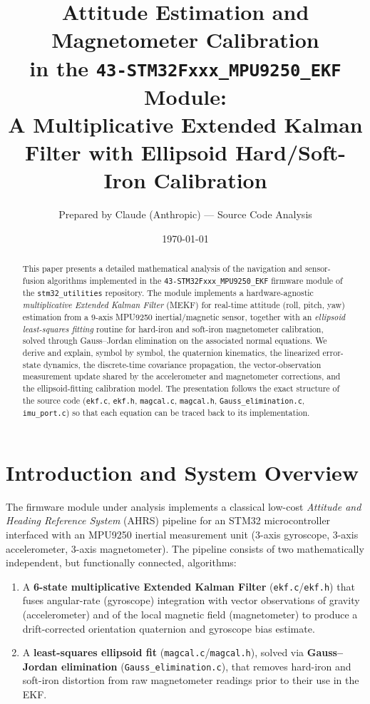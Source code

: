 \documentclass[11pt]{article}
\title{\bfseries Attitude Estimation and Magnetometer Calibration \\
in the \texttt{43-STM32Fxxx\_MPU9250\_EKF} Module:\\
A Multiplicative Extended Kalman Filter with Ellipsoid Hard/Soft-Iron Calibration}
\author{Prepared by Claude (Anthropic) --- Source Code Analysis}
\date{\today}
\begin{document}
\maketitle

\begin{abstract}
This paper presents a detailed mathematical analysis of the navigation and sensor-fusion algorithms implemented in the \texttt{43-STM32Fxxx\_MPU9250\_EKF} firmware module of the \texttt{stm32\_utilities} repository. The module implements a hardware-agnostic \emph{multiplicative Extended Kalman Filter} (MEKF) for real-time attitude (roll, pitch, yaw) estimation from a 9-axis MPU9250 inertial/magnetic sensor, together with an \emph{ellipsoid least-squares fitting} routine for hard-iron and soft-iron magnetometer calibration, solved through Gauss--Jordan elimination on the associated normal equations. We derive and explain, symbol by symbol, the quaternion kinematics, the linearized error-state dynamics, the discrete-time covariance propagation, the vector-observation measurement update shared by the accelerometer and magnetometer corrections, and the ellipsoid-fitting calibration model. The presentation follows the exact structure of the source code (\texttt{ekf.c}, \texttt{ekf.h}, \texttt{magcal.c}, \texttt{magcal.h}, \texttt{Gauss\_elimination.c}, \texttt{imu\_port.c}) so that each equation can be traced back to its implementation.
\end{abstract}

\tableofcontents

\section{Introduction and System Overview}

The firmware module under analysis implements a classical low-cost \emph{Attitude and Heading Reference System} (AHRS) pipeline for an STM32 microcontroller interfaced with an MPU9250 inertial measurement unit (3-axis gyroscope, 3-axis accelerometer, 3-axis magnetometer). The pipeline consists of two mathematically independent, but functionally connected, algorithms:

\begin{enumerate}[label=(\roman*)]
    \item A \textbf{6-state multiplicative Extended Kalman Filter} (\texttt{ekf.c}/\texttt{ekf.h}) that fuses angular-rate (gyroscope) integration with vector observations of gravity (accelerometer) and of the local magnetic field (magnetometer) to produce a drift-corrected orientation quaternion and gyroscope bias estimate.
    \item A \textbf{least-squares ellipsoid fit} (\texttt{magcal.c}/\texttt{magcal.h}), solved via \textbf{Gauss--Jordan elimination} (\texttt{Gauss\_elimination.c}), that removes hard-iron and soft-iron distortion from raw magnetometer readings prior to their use in the EKF.
\end{enumerate}
\end{document}
